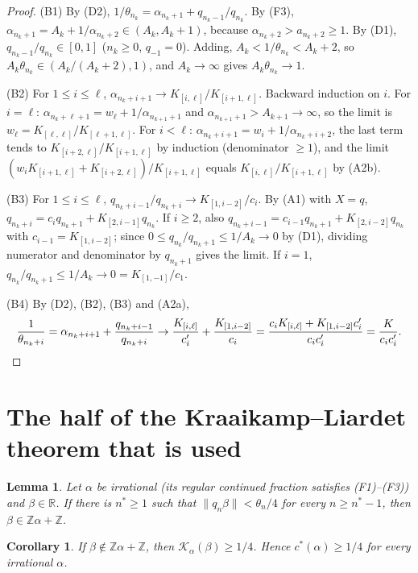 \documentclass[11pt]{amsart}
\newtheorem{corollary}[theorem]{Corollary}
\newtheorem{lemma}[theorem]{Lemma}
\theoremstyle{definition}
\theoremstyle{remark}
\newcommand{\Z}{\mathbb{Z}}
\newcommand{\R}{\mathbb{R}}
\newcommand{\dist}[1]{\lVert #1\rVert}
\newcommand{\KL}{\mathcal{K}}
\begin{document}
\begin{proof}
(B1) By (D2), $1/\theta_{n_k}=\alpha_{n_k+1}+q_{n_k-1}/q_{n_k}$. By (F3),
$\alpha_{n_k+1}=A_k+1/\alpha_{n_k+2}\in(A_k,A_k+1)$, because $\alpha_{n_k+2}>a_{n_k+2}\ge1$. By (D1),
$q_{n_k-1}/q_{n_k}\in[0,1]$ ($n_k\ge0$, $q_{-1}=0$). Adding, $A_k<1/\theta_{n_k}<A_k+2$, so
$A_k\theta_{n_k}\in(A_k/(A_k+2),1)$, and $A_k\to\infty$ gives $A_k\theta_{n_k}\to1$.

(B2) For $1\le i\le\ell$, $\alpha_{n_k+i+1}\to K_{[i,\ell]}/K_{[i+1,\ell]}$. Backward induction on $i$. For
$i=\ell$: $\alpha_{n_k+\ell+1}=w_\ell+1/\alpha_{n_{k+1}+1}$ and $\alpha_{n_{k+1}+1}>A_{k+1}\to\infty$, so the limit is
$w_\ell=K_{[\ell,\ell]}/K_{[\ell+1,\ell]}$. For $i<\ell$: $\alpha_{n_k+i+1}=w_i+1/\alpha_{n_k+i+2}$, the last
term tends to $K_{[i+2,\ell]}/K_{[i+1,\ell]}$ by induction (denominator $\ge1$), and the limit
$(w_iK_{[i+1,\ell]}+K_{[i+2,\ell]})/K_{[i+1,\ell]}$ equals $K_{[i,\ell]}/K_{[i+1,\ell]}$ by (A2b).

(B3) For $1\le i\le\ell$, $q_{n_k+i-1}/q_{n_k+i}\to K_{[1,i-2]}/c_i$. By (A1) with $X=q$,
$q_{n_k+i}=c_iq_{n_k+1}+K_{[2,i-1]}q_{n_k}$. If $i\ge2$, also
$q_{n_k+i-1}=c_{i-1}q_{n_k+1}+K_{[2,i-2]}q_{n_k}$ with $c_{i-1}=K_{[1,i-2]}$; since
$0\le q_{n_k}/q_{n_k+1}\le1/A_k\to0$ by (D1), dividing numerator and denominator by $q_{n_k+1}$ gives the
limit. If $i=1$, $q_{n_k}/q_{n_k+1}\le1/A_k\to0=K_{[1,-1]}/c_1$.

(B4) By (D2), (B2), (B3) and (A2a),
\[
\frac1{\theta_{n_k+i}}=\alpha_{n_k+i+1}+\frac{q_{n_k+i-1}}{q_{n_k+i}}\to\frac{K_{[i,\ell]}}{c_i'}+\frac{K_{[1,i-2]}}{c_i}
=\frac{c_iK_{[i,\ell]}+K_{[1,i-2]}c_i'}{c_ic_i'}=\frac K{c_ic_i'}.\qedhere
\]
\end{proof}

\section{The half of the Kraaikamp--Liardet theorem that is used}\label{sec:lemma0}

\begin{lemma}\label{lem:0}
Let $\alpha$ be irrational (its regular continued fraction satisfies (F1)--(F3)) and $\beta\in\R$. If there is
$n^*\ge1$ such that $\dist{q_n\beta}<\theta_n/4$ for every $n\ge n^*-1$, then $\beta\in\Z\alpha+\Z$.
\end{lemma}

\begin{corollary}\label{cor:0}
If $\beta\notin\Z\alpha+\Z$, then $\KL_\alpha(\beta)\ge1/4$. Hence $c^*(\alpha)\ge1/4$ for every irrational $\alpha$.
\end{corollary}
\end{document}
